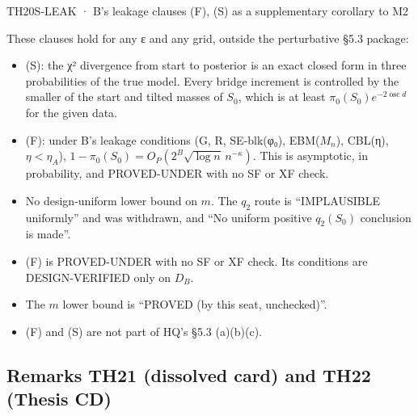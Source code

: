 \begin{card}{TH20}{S-LEAK · B's leakage clauses (F), (S) as a supplementary corollary to M2}
\begin{plain}
These clauses hold for any ε and any grid, outside the perturbative §5.3 package:
\begin{itemize}
\item (S): the χ² divergence from start to posterior is an exact closed form in three probabilities of the true model. Every bridge increment is controlled by the smaller of the start and tilted masses of $S_0$, which is at least $\pi_0(S_0)e^{-2\operatorname{osc} d}$ for the given data.
\item (F): under B's leakage conditions (G, R, SE-blk(φ₀), EBM($M_n$), CBL(η), $\eta<\eta_A$), $1-\pi_0(S_0)=O_P(2^B\sqrt{\log n}\,n^{-\kappa})$. This is asymptotic, in probability, and PROVED-UNDER with no SF or XF check.
\end{itemize}
\end{plain}
\begin{notproved}
\begin{itemize}
\item No design-uniform lower bound on $m$. The $q_2$ route is ``IMPLAUSIBLE uniformly'' and was withdrawn, and ``No uniform positive $q_2(S_0)$ conclusion is made''.
\item (F) is PROVED-UNDER with no SF or XF check. Its conditions are DESIGN-VERIFIED only on $D_B$.
\item The $m$ lower bound is ``PROVED (by this seat, unchecked)''.
\item (F) and (S) are not part of HQ's §5.3 (a)(b)(c).
\end{itemize}
\end{notproved}
\end{card}

\subsection{Remarks TH21 (dissolved card) and TH22 (Thesis CD)}\label{sec:supp-remarks}

